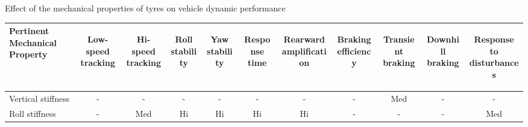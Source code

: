 \begin{table}[H]
\begin{threeparttable}
		\caption{Effect of the mechanical properties of tyres on vehicle dynamic performance}
		\label{table:effect-of-the-mechanical-properties-of-tyres-on-vehicle-dynamic-performance}

	\end{threeparttable}
\end{table}

\begin{table}[H]
	\centering\footnotesize
	\begin{threeparttable}
	
        \begin{tabulary}{\textwidth}{lcccccccccc}
            \toprule
            \textbf{Pertinent Mechanical Property} & \begin{sideways}\textbf{Low-speed tracking}\end{sideways} & \begin{sideways}\textbf{Hi-speed tracking}\end{sideways} & \begin{sideways}\textbf{Roll stability}\end{sideways} & \begin{sideways}\textbf{Yaw stability}\end{sideways} & \begin{sideways}\textbf{Response time}\end{sideways} & \begin{sideways}\textbf{Rearward amplification}\end{sideways} & \begin{sideways}\textbf{Braking efficiency}\end{sideways} & \begin{sideways}\textbf{Transient braking}\end{sideways} & \begin{sideways}\textbf{Downhill braking}\end{sideways} & \begin{sideways}\textbf{Response to disturbances}\end{sideways} \\\midrule
            Vertical stiffness & -     & -     & -     & -     & -     & -     & -     & Med   & -     & - \\
            Roll stiffness & -     & Med   & Hi    & Hi    & Hi    & Hi    & -     & -     & -     & Med \\

\end{tabulary}
\end{threeparttable}
\end{table}
